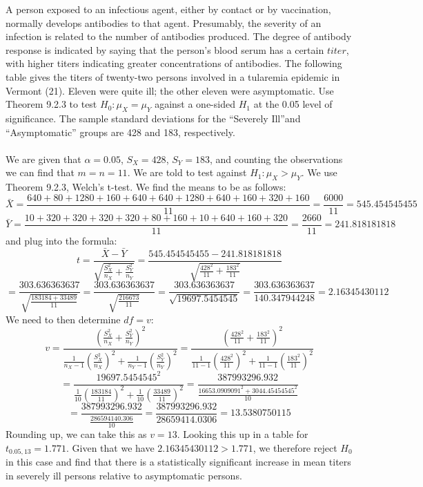 \documentclass{article}
\begin{document}
{A person exposed to an infectious agent, either by contact or by vaccination, normally develops antibodies to that agent. Presumably, the severity of an infection is related to the number of antibodies produced. The degree of antibody response is indicated by saying that the person's blood serum has a certain \(titer\), with higher titers indicating greater concentrations of antibodies. The following table gives the titers of twenty-two persons involved in a tularemia epidemic in Vermont (21). Eleven were quite ill; the other eleven were asymptomatic. Use Theorem 9.2.3 to test \(H_0: \mu_X = \mu_Y\) against a one-sided \(H_1\) at the 0.05 level of significance. The sample standard deviations for the “Severely Ill”and “Asymptomatic” groups are 428 and 183, respectively.
\\
\\
We are given that \(\alpha = 0.05\), \(S_X = 428\), \(S_Y = 183\), and counting the observations we can find that \(m = n = 11\). We are told to test against \(H_1: \mu_X > \mu_Y\). We use Theorem 9.2.3, Welch's t-test. We find the means to be as follows:
\[
\bar{X} = \frac{640 + 80 + 1280 + 160 + 640 + 640 + 1280 + 640 + 160 + 320 + 160}{11} = \frac{6000}{11} = 545.454545455
\]
\[
\bar{Y} = \frac{10 + 320 + 320 + 320 + 320 + 80 + 160 + 10 + 640 + 160 + 320}{11} = \frac{2660}{11} = 241.818181818
\]
and plug into the formula:
\[
t = \frac{\bar{X} - \bar{Y}}{\sqrt{\frac{S^2_X}{n_X} + \frac{S^2_Y}{n_Y}}} = \frac{545.454545455 - 241.818181818}{\sqrt{\frac{428^2}{11} + \frac{183^2}{11}}}
\]
\[
= \frac{303.636363637}{\sqrt{\frac{183184 + 33489}{11}}} = \frac{303.636363637}{\sqrt{\frac{216673}{11}}} = \frac{303.636363637}{\sqrt{19697.5454545}} = \frac{303.636363637}{140.347944248} = 2.16345430112
\]
We need to then determine \(df = v\):
\[
v = \frac{(\frac{S^2_X}{n_X} + \frac{S^2_Y}{n_Y})^2}{\frac{1}{n_X - 1}(\frac{S^2_X}{n_X})^2 + \frac{1}{n_Y - 1}(\frac{S^2_Y}{n_Y})^2} = \frac{(\frac{428^2}{11} + \frac{183^2}{11})^2}{\frac{1}{11 - 1}(\frac{428^2}{11})^2 + \frac{1}{11 - 1}(\frac{183^2}{11})^2}
\]
\[
= \frac{19697.5454545^2}{\frac{1}{10}(\frac{183184}{11})^2 + \frac{1}{10}(\frac{33489}{11})^2} = \frac{387993296.932}{\frac{ 16653.0909091^2 + 3044.45454545^2}{10}}
\]
\[
= \frac{387993296.932}{\frac{286594140.306}{10}} = \frac{387993296.932}{28659414.0306} = 13.5380750115
\]
Rounding up, we can take this as \(v = 13\). Looking this up in a table for \(t_{0.05, 13} = 1.771\). Given that we have \(2.16345430112 > 1.771\), we therefore reject \(H_0\) in this case and find that there is a statistically significant increase in mean titers in severely ill persons relative to asymptomatic persons.

}
\end{document}
